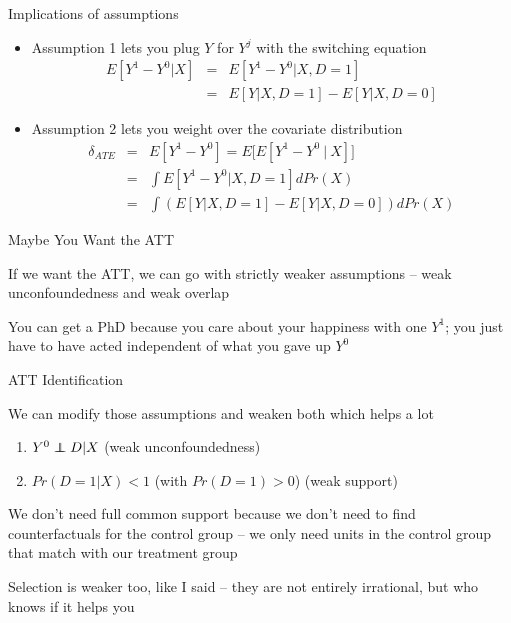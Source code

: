 \documentclass{beamer}
\newcommand\independent{\protect\mathpalette{\protect\independenT}{\perp}}
\def\independenT#1#2{\mathrel{\rlap{$#1#2$}\mkern2mu{#1#2}}}
\begin{document}
\begin{frame}{Implications of assumptions}


	\begin{itemize}
	\item Assumption 1 lets you plug $Y$ for $Y^j$ with the switching equation
		\begin{eqnarray*}
		E[Y^1-Y^0|X] &=& E[Y^1 - Y^0 | X,D=1] \\
		&=&E[Y|X,D=1] - E[Y|X,D=0]
		\end{eqnarray*}
	\item Assumption 2 lets you weight over the covariate distribution
		\begin{eqnarray*}
		\delta_{ATE} &=&E[Y^1-Y^0] = E\bigg[ E[Y^1 - Y^0 \ \vert \ X] \bigg] \\
		&=& \int E[Y^1 - Y^0 |X,D=1] dPr(X) \\
		&=& \int \left(E[Y|X,D=1] - E[Y|X,D=0]\right)dPr(X)
		\end{eqnarray*}
	\end{itemize}

\end{frame}


\begin{frame}{Maybe You Want the ATT}


If we want the ATT, we can go with strictly weaker assumptions -- weak unconfoundedness and weak overlap

\bigskip

You can get a PhD because you care about your happiness with one $Y^1$; you just have to have acted independent of what you gave up $Y^0$

\end{frame}




\begin{frame}{ATT Identification}

We can modify those assumptions and weaken both which helps a lot

\begin{enumerate}
  \item $Y^0 \independent{D} | X$ (weak unconfoundedness)
  \item $Pr(D=1|X)<1$ (with $Pr(D=1)>0$) (weak support)
\end{enumerate}

\bigskip

We don't need full common support because we don't need to find counterfactuals for the control group -- we only need units in the control group that match with our treatment group

\bigskip

Selection is weaker too, like I said -- they are not entirely irrational, but who knows if it helps you

\end{frame}
\end{document}

